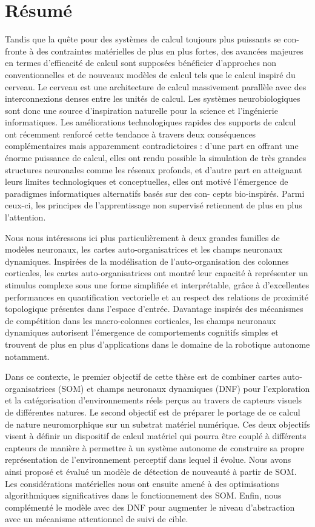\chapter*{Résumé}
\markboth{}{}

Tandis que la quête pour des systèmes de calcul toujours plus puissants se con- fronte à des contraintes matérielles de plus en plus fortes, des avancées majeures en termes d’efficacité de calcul sont supposées bénéficier d’approches non conventionnelles et de nouveaux modèles de calcul tels que le calcul inspiré du cerveau. Le cerveau est une architecture de calcul massivement parallèle avec des interconnexions denses entre les unités de calcul. Les systèmes neurobiologiques sont donc une source d'inspiration naturelle pour la science et l'ingénierie informatiques. Les améliorations technologiques rapides des supports de calcul ont récemment renforcé cette tendance à travers deux conséquences complémentaires mais apparemment contradictoires : d’une part en offrant une énorme puissance de calcul, elles ont rendu possible la simulation de très grandes structures neuronales comme les réseaux profonds, et d’autre part en atteignant leurs limites technologiques et conceptuelles, elles ont motivé l'émergence de paradigmes informatiques alternatifs basés sur des con- cepts bio-inspirés. Parmi ceux-ci, les principes de l’apprentissage non supervisé retiennent de plus en plus l’attention. 

Nous nous intéressons ici plus particulièrement à deux grandes familles de modèles neuronaux, les cartes auto-organisatrices et les champs neuronaux dynamiques. Inspirées de la modélisation de l’auto-organisation des colonnes corticales, les cartes auto-organisatrices ont montré leur capacité à représenter un stimulus complexe sous une forme simplifiée et interprétable, grâce à d’excellentes performances en quantification vectorielle et au respect des relations de proximité topologique présentes dans l’espace d’entrée. Davantage inspirés des mécanismes de compétition dans les macro-colonnes corticales, les champs neuronaux dynamiques autorisent l’émergence de comportements cognitifs simples et trouvent de plus en plus d’applications dans le domaine de la robotique autonome notamment.

Dans ce contexte, le premier objectif de cette thèse est de combiner cartes auto-organisatrices (SOM) et champs neuronaux dynamiques (DNF) pour l’exploration et la catégorisation d’environnements réels perçus au travers de capteurs visuels de différentes natures. Le second objectif est de préparer le portage de ce calcul de nature neuromorphique sur un substrat matériel numérique. Ces deux objectifs visent à définir un dispositif de calcul matériel qui pourra être couplé à différents capteurs de manière à permettre à un système autonome de construire sa propre représentation de l’environnement perceptif dans lequel il évolue. Nous avons ainsi proposé et évalué un modèle de détection de nouveauté à partir de SOM. Les considérations matérielles nous ont ensuite amené à des optimisations algorithmiques significatives dans le fonctionnement des SOM. Enfin, nous complémenté le modèle avec des DNF pour augmenter le niveau d'abstraction avec un mécanisme attentionnel de suivi de cible.

